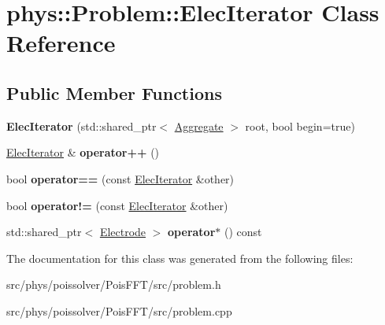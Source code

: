 \hypertarget{classphys_1_1Problem_1_1ElecIterator}{}\section{phys\+:\+:Problem\+:\+:Elec\+Iterator Class Reference}
\label{classphys_1_1Problem_1_1ElecIterator}
\subsection*{Public Member Functions}
\begin{DoxyCompactItemize}
\item 
{\bfseries Elec\+Iterator} (std\+::shared\+\_\+ptr$<$ \hyperlink{classphys_1_1Problem_1_1Aggregate}{Aggregate} $>$ root, bool begin=true)\hypertarget{classphys_1_1Problem_1_1ElecIterator_af77fdb17229e7a99e64c8be472be9032}{}\label{classphys_1_1Problem_1_1ElecIterator_af77fdb17229e7a99e64c8be472be9032}

\item 
\hyperlink{classphys_1_1Problem_1_1ElecIterator}{Elec\+Iterator} \& {\bfseries operator++} ()\hypertarget{classphys_1_1Problem_1_1ElecIterator_aef84f841b01b14677a98e3cf86d1ecbc}{}\label{classphys_1_1Problem_1_1ElecIterator_aef84f841b01b14677a98e3cf86d1ecbc}

\item 
bool {\bfseries operator==} (const \hyperlink{classphys_1_1Problem_1_1ElecIterator}{Elec\+Iterator} \&other)\hypertarget{classphys_1_1Problem_1_1ElecIterator_a4a227012eee69e6de49582f53035a26a}{}\label{classphys_1_1Problem_1_1ElecIterator_a4a227012eee69e6de49582f53035a26a}

\item 
bool {\bfseries operator!=} (const \hyperlink{classphys_1_1Problem_1_1ElecIterator}{Elec\+Iterator} \&other)\hypertarget{classphys_1_1Problem_1_1ElecIterator_a264799052b0cfcc894304026738e8fa9}{}\label{classphys_1_1Problem_1_1ElecIterator_a264799052b0cfcc894304026738e8fa9}

\item 
std\+::shared\+\_\+ptr$<$ \hyperlink{structphys_1_1Problem_1_1Electrode}{Electrode} $>$ {\bfseries operator$\ast$} () const \hypertarget{classphys_1_1Problem_1_1ElecIterator_a14b4aa5fed5181688938b839cf2530f0}{}\label{classphys_1_1Problem_1_1ElecIterator_a14b4aa5fed5181688938b839cf2530f0}

\end{DoxyCompactItemize}


The documentation for this class was generated from the following files\+:\begin{DoxyCompactItemize}
\item 
src/phys/poissolver/\+Pois\+F\+F\+T/src/problem.\+h\item 
src/phys/poissolver/\+Pois\+F\+F\+T/src/problem.\+cpp\end{DoxyCompactItemize}
